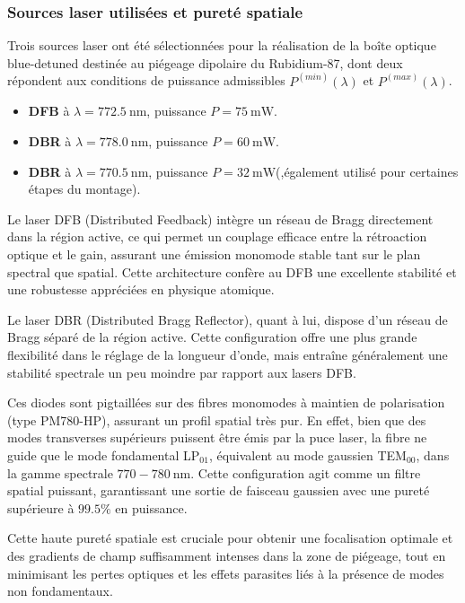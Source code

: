\subsubsection*{Sources laser utilisées et pureté spatiale}

Trois sources laser ont été sélectionnées pour la réalisation de la boîte optique blue-detuned destinée au piégeage dipolaire du Rubidium-87, dont deux répondent aux conditions de puissance admissibles $P^{(min)}(\lambda)$ et $P^{(max)}(\lambda)$.

\begin{itemize}
    \item \textbf{DFB} à $\lambda = 772.5~\text{nm}$, puissance $P = 75~\text{mW}$.
    \item \textbf{DBR} à $\lambda = 778.0~\text{nm}$, puissance $P = 60~\text{mW}$. 
    \item \textbf{DBR} à $\lambda = 770.5~\text{nm}$, puissance $P = 32~\text{mW}$(,également utilisé pour certaines étapes du montage).
\end{itemize}

\medskip

Le laser DFB (Distributed Feedback) intègre un réseau de Bragg directement dans la région active, ce qui permet un couplage efficace entre la rétroaction optique et le gain, assurant une émission monomode stable tant sur le plan spectral que spatial. Cette architecture confère au DFB une excellente stabilité et une robustesse appréciées en physique atomique.

Le laser DBR (Distributed Bragg Reflector), quant à lui, dispose d’un réseau de Bragg séparé de la région active. Cette configuration offre une plus grande flexibilité dans le réglage de la longueur d’onde, mais entraîne généralement une stabilité spectrale un peu moindre par rapport aux lasers DFB.

\medskip

Ces diodes sont pigtaillées sur des fibres monomodes à maintien de polarisation (type PM780-HP), assurant un profil spatial très pur. En effet, bien que des modes transverses supérieurs puissent être émis par la puce laser, la fibre ne guide que le mode fondamental LP$_{01}$, équivalent au mode gaussien TEM$_{00}$, dans la gamme spectrale $770{-}780~\text{nm}$. Cette configuration agit comme un filtre spatial puissant, garantissant une sortie de faisceau gaussien avec une pureté supérieure à $99.5\%$ en puissance.

\medskip

Cette haute pureté spatiale est cruciale pour obtenir une focalisation optimale et des gradients de champ suffisamment intenses dans la zone de piégeage, tout en minimisant les pertes optiques et les effets parasites liés à la présence de modes non fondamentaux.

